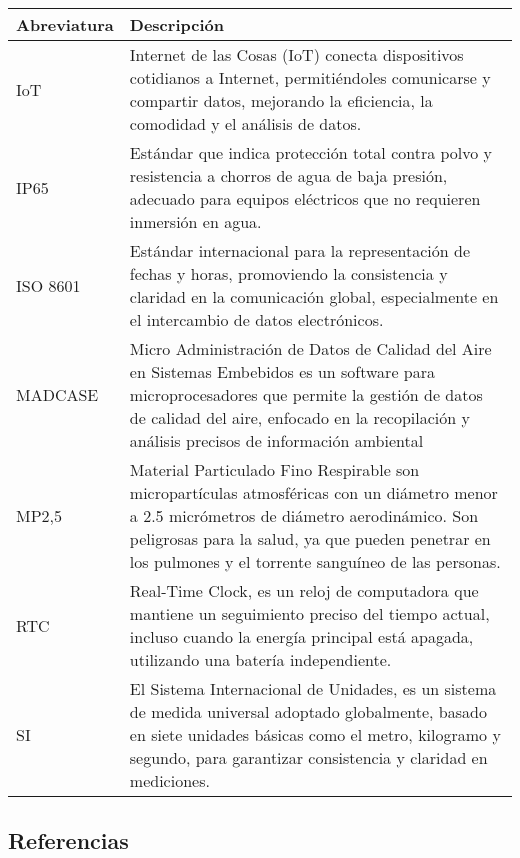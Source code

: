 \documentclass[
11pt, %
codirector, %
]{charter}
\begin{document}
\begin{tabular}{lp{13cm}}
	\toprule
	\textbf{Abreviatura}	& \textbf{Descripción}  \\
    \midrule
    
    	IoT & Internet de las Cosas (IoT) conecta dispositivos cotidianos a Internet, permitiéndoles comunicarse y compartir datos, mejorando la eficiencia, la comodidad y el análisis de datos. \\

		IP65 & Estándar que indica protección total contra polvo y resistencia a chorros de agua de baja presión, adecuado para equipos eléctricos que no requieren inmersión en agua. \\
		
		ISO 8601 & Estándar internacional para la representación de fechas y horas, promoviendo la consistencia y claridad en la comunicación global, especialmente en el intercambio de datos electrónicos. \\    
		    
		MADCASE & Micro Administración de Datos de Calidad del Aire en Sistemas Embebidos es un software para microprocesadores que permite la gestión de datos de calidad del aire, enfocado en la recopilación y análisis precisos de información ambiental \\
		
		MP2,5 & Material Particulado Fino Respirable son micropartículas atmosféricas con un diámetro menor a 2.5 micrómetros de diámetro aerodinámico. Son peligrosas para la salud, ya que pueden penetrar en los pulmones y el torrente sanguíneo de las personas.\\
		
		RTC & Real-Time Clock, es un reloj de computadora que mantiene un seguimiento preciso del tiempo actual, incluso cuando la energía principal está apagada, utilizando una batería independiente. \\
		
		SI & El Sistema Internacional de Unidades, es un sistema de medida universal adoptado globalmente, basado en siete unidades básicas como el metro, kilogramo y segundo, para garantizar consistencia y claridad en mediciones. \\
		\bottomrule

\end{tabular}


\subsection{Referencias}
\label{sec:org62711e0}
\end{document}
